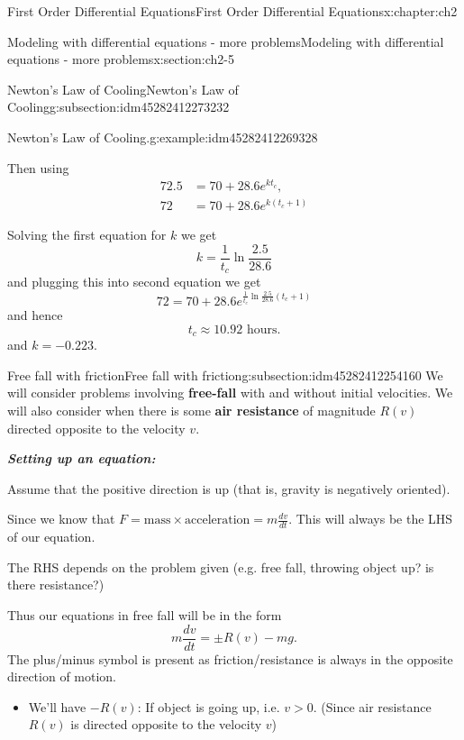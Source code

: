 \documentclass[oneside,10pt,]{book}
\newcommand{\alert}[1]{\textbf{\textit{#1}}}
\newcommand{\terminology}[1]{\textbf{#1}}
\numberwithin{equation}{section}
\numberwithin{equation}{section}
\newcommand{\amp}{&}
\begin{document}
\begin{chapterptx}{First Order Differential Equations}{}{First Order Differential Equations}{}{}{x:chapter:ch2}
\begin{sectionptx}{Modeling with differential equations - more problems}{}{Modeling with differential equations - more problems}{}{}{x:section:ch2-5}
\begin{subsectionptx}{Newton's Law of Cooling}{}{Newton's Law of Cooling}{}{}{g:subsection:idm45282412273232}
\begin{example}{Newton's Law of Cooling.}{g:example:idm45282412269328}
%
\par
Then using%
\begin{align*}
72.5 \amp =70+28.6e^{kt_{c}},\\
72 \amp =70+28.6e^{k(t_{c}+1)}
\end{align*}
%
\par
Solving the first equation for \(k\) we get%
\begin{equation*}
k=\frac{1}{t_{c}}\ln\frac{2.5}{28.6}
\end{equation*}
and plugging this into second equation we get%
\begin{equation*}
72=70+28.6e^{\frac{1}{t_{c}}\ln\frac{2.5}{28.6}(t_{c}+1)}
\end{equation*}
and hence%
\begin{equation*}
t_{c}\approx10.92\text{ hours}.
\end{equation*}
and \(k=-0.223\).%
\end{example}
\end{subsectionptx}
%
%
\typeout{************************************************}
\typeout{************************************************}
%
\begin{subsectionptx}{Free fall with friction}{}{Free fall with friction}{}{}{g:subsection:idm45282412254160}
We will consider problems involving \terminology{free-fall} with and without initial velocities. We will also consider when there is some \terminology{air resistance} of magnitude \(R(v)\) directed opposite to the velocity \(v\).%
\par
\alert{Setting up an equation:}%
\par
Assume that the positive direction is up (that is, gravity is negatively oriented).%
\par
Since we know that \(F=\text{mass}\times\text{acceleration}=m\frac{dv}{dt}\). This will always be the LHS of our equation.%
\par
The RHS depends on the problem given (e.g. free fall, throwing object up? is there resistance?)%
\par
Thus our equations in free fall will be in the form%
\begin{equation*}
m\frac{dv}{dt}=\pm R(v) - mg.
\end{equation*}
The plus\slash{}minus symbol is present as friction\slash{}resistance is always in the opposite direction of motion.%
%
\begin{itemize}[label=\textbullet]
\item{}We'll have \(-R(v)\): If object is going up, i.e. \(v>0\). (Since air resistance \(R(v)\) is directed opposite to the velocity \(v\))%

\end{itemize}
\end{subsectionptx}
\end{sectionptx}
\end{chapterptx}
\end{document}
